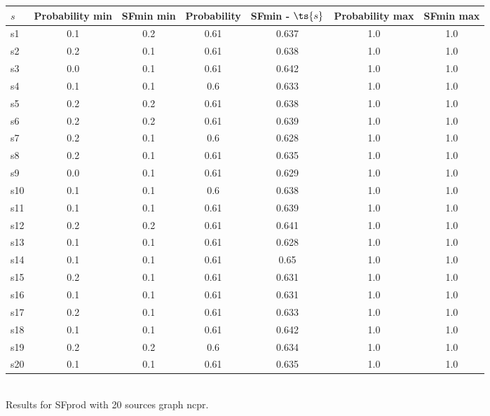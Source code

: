 \documentclass{article}
\begin{document}
\noindent\begin{tabular}{|l|c|c|c|c|c|c|}
\hline
$s$& Probability min & SFmin min & Probability & SFmin - $\ts{s}$ & Probability max & SFmin max\\
\hline
s1 &0.1 & 0.2 & 0.61 & 0.637 & 1.0 & 1.0\\
\hline
s2 &0.2 & 0.1 & 0.61 & 0.638 & 1.0 & 1.0\\
\hline
s3 &0.0 & 0.1 & 0.61 & 0.642 & 1.0 & 1.0\\
\hline
s4 &0.1 & 0.1 & 0.6 & 0.633 & 1.0 & 1.0\\
\hline
s5 &0.2 & 0.2 & 0.61 & 0.638 & 1.0 & 1.0\\
\hline
s6 &0.2 & 0.2 & 0.61 & 0.639 & 1.0 & 1.0\\
\hline
s7 &0.2 & 0.1 & 0.6 & 0.628 & 1.0 & 1.0\\
\hline
s8 &0.2 & 0.1 & 0.61 & 0.635 & 1.0 & 1.0\\
\hline
s9 &0.0 & 0.1 & 0.61 & 0.629 & 1.0 & 1.0\\
\hline
s10 &0.1 & 0.1 & 0.6 & 0.638 & 1.0 & 1.0\\
\hline
s11 &0.1 & 0.1 & 0.61 & 0.639 & 1.0 & 1.0\\
\hline
s12 &0.2 & 0.2 & 0.61 & 0.641 & 1.0 & 1.0\\
\hline
s13 &0.1 & 0.1 & 0.61 & 0.628 & 1.0 & 1.0\\
\hline
s14 &0.1 & 0.1 & 0.61 & 0.65 & 1.0 & 1.0\\
\hline
s15 &0.2 & 0.1 & 0.61 & 0.631 & 1.0 & 1.0\\
\hline
s16 &0.1 & 0.1 & 0.61 & 0.631 & 1.0 & 1.0\\
\hline
s17 &0.2 & 0.1 & 0.61 & 0.633 & 1.0 & 1.0\\
\hline
s18 &0.1 & 0.1 & 0.61 & 0.642 & 1.0 & 1.0\\
\hline
s19 &0.2 & 0.2 & 0.6 & 0.634 & 1.0 & 1.0\\
\hline
s20 &0.1 & 0.1 & 0.61 & 0.635 & 1.0 & 1.0\\
\hline
\end{tabular}\\

\noindent Results for SFprod with 20 sources graph ncpr.
\end{document}
